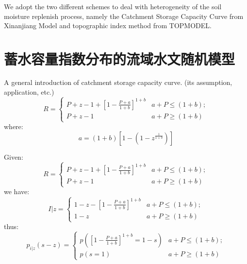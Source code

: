 We adopt the two different schemes to deal with heterogeneity of the soil moisture replenish process, namely the Catchment Storage Capacity Curve from Xinanjiang Model and topographic index method from TOPMODEL.
\section{蓄水容量指数分布的流域水文随机模型}
A general introduction of catchment storage capacity curve. (its assumption, application, etc.)
\begin{equation}
R=
 \begin{cases}
 P+z-1+[1-\frac{P+a}{1+b}]^{1+b}&{a+P\leq (1+b)};\\P+z-1 &{a+P\geq (1+b)}
 \end{cases}
\end{equation}
where:
\begin{equation}
a=(1+b)[1-(1-z^{\frac{1}{1+b}})]
\end{equation}

Given:
\begin{equation}
R=
 \begin{cases}
 P+z-1+[1-\frac{P+a}{1+b}]^{1+b}&{a+P\leq (1+b)};\\P+z-1 &{a+P\geq (1+b)}
 \end{cases}
\end{equation}
we have:
\begin{equation}
I\vert z=
 \begin{cases}
 1-z-[1-\frac{P+a}{1+b}]^{1+b}&{a+P\leq (1+b)};\\1-z &{a+P\geq (1+b)}
 \end{cases}
\end{equation}
thus:
\begin{equation}
p_{i|z}(s-z)=
 \begin{cases}
 p([1-\frac{P+a}{1+b}]^{1+b}=1-s)&{a+P\leq (1+b)};\\p(s=1) &{a+P\geq (1+b)}
 \end{cases}
\end{equation}

